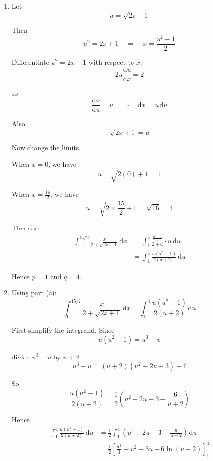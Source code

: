 \documentclass[leqno]{article}
\begin{document}
\begin{enumerate}[
  label=\textbf{\arabic*.},
  leftmargin=*,
  topsep=0pt,
  partopsep=0pt,
  parsep=0pt
]
\begin{djsSolution}
\begin{enumerate}[label=\textbf{(\alph*)}]
  \item Let
  \[
  u=\sqrt{2x+1}
  \]

  Then
  \[
  u^2=2x+1\quad\Longrightarrow\quad x=\frac{u^2-1}{2}
  \]

  Differentiate \(u^2=2x+1\) with respect to \(x\):
  \[
  2u\frac{\mathrm{d}u}{\mathrm{d}x}=2
  \]

  so
  \[
  \frac{\mathrm{d}x}{\mathrm{d}u}=u\quad\Longrightarrow\quad\mathrm{d}x=u\,\mathrm{d}u
  \]

  Also
  \[
  \sqrt{2x+1}=u
  \]

  Now change the limits.

  When \(x=0\), we have
  \[
  u=\sqrt{2(0)+1}=1
  \]

  When \(x=\frac{15}{2}\), we have
  \[
  u=\sqrt{2\times \frac{15}{2}+1}=\sqrt{16}=4
  \]

  Therefore
  \begin{align*}
  \int_0^{15/2}\frac{x}{2+\sqrt{2x+1}}\,\mathrm{d}x
  &=\int_1^4 \frac{\frac{u^2-1}{2}}{2+u}\cdot u\,\mathrm{d}u\\
  &=\int_1^4 \frac{u(u^2-1)}{2(u+2)}\,\mathrm{d}u
  \end{align*}

  Hence \(p=1\) and \(q=4\).

  \item Using part (a):
  \[
  \int_0^{15/2}\frac{x}{2+\sqrt{2x+1}}\,\mathrm{d}x
  =\int_1^4 \frac{u(u^2-1)}{2(u+2)}\,\mathrm{d}u
  \]

  First simplify the integrand. Since
  \[
  u(u^2-1)=u^3-u
  \]

  divide \(u^3-u\) by \(u+2\):
  \[
  u^3-u=(u+2)(u^2-2u+3)-6
  \]

  So
  \[
  \frac{u(u^2-1)}{2(u+2)}
  =\frac{1}{2}\left(u^2-2u+3-\frac{6}{u+2}\right)
  \]

  Hence
  \begin{align*}
  \int_1^4 \frac{u(u^2-1)}{2(u+2)}\,\mathrm{d}u
  &=\frac12\int_1^4 \left(u^2-2u+3-\frac{6}{u+2}\right)\,\mathrm{d}u\\
  &=\frac12\left[\frac{u^3}{3}-u^2+3u-6\ln(u+2)\right]_1^4
  \end{align*}


\end{enumerate}
\end{djsSolution}
\end{enumerate}
\end{document}
